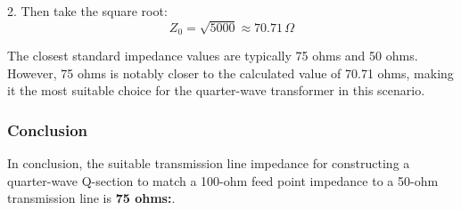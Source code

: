 2. Then take the square root:
   \[
   Z_0 = \sqrt{5000} \approx 70.71 \, \Omega
   \]

The closest standard impedance values are typically 75 ohms and 50 ohms. However, 75 ohms is notably closer to the calculated value of 70.71 ohms, making it the most suitable choice for the quarter-wave transformer in this scenario.

\subsubsection{Conclusion}
In conclusion, the suitable transmission line impedance for constructing a quarter-wave Q-section to match a 100-ohm feed point impedance to a 50-ohm transmission line is \textbf{75 ohms:}.

